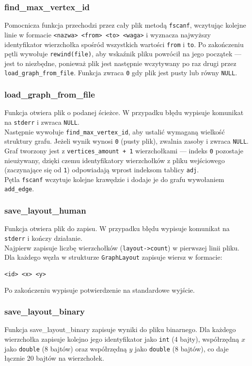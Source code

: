 \documentclass[12pt]{article}
\begin{document}
\subsubsection{find\_max\_vertex\_id}
Pomocnicza funkcja przechodzi przez cały plik metodą \texttt{fscanf}, wczytując kolejne
linie w formacie \texttt{<nazwa> <from> <to> <waga>} i wyznacza najwyższy identyfikator
wierzchołka spośród wszystkich wartości \texttt{from} i \texttt{to}.
Po zakończeniu pętli wywołuje \texttt{rewind(file)}, aby wskaźnik pliku powrócił na
jego początek --- jest to niezbędne, ponieważ plik jest następnie wczytywany po raz
drugi przez \texttt{load\_graph\_from\_file}. Funkcja zwraca \texttt{0} gdy plik jest
pusty lub równy \texttt{NULL}.

\subsubsection{load\_graph\_from\_file}
Funkcja otwiera plik o podanej ścieżce. W przypadku błędu wypisuje komunikat na
\texttt{stderr} i zwraca \texttt{NULL}.\\
Następnie wywołuje \texttt{find\_max\_vertex\_id}, aby ustalić wymaganą wielkość
struktury grafu. Jeżeli wynik wynosi \texttt{0} (pusty plik), zwalnia zasoby i zwraca
\texttt{NULL}.\\
Graf tworzony jest z \texttt{vertices\_amount + 1} wierzchołkami --- indeks \texttt{0}
pozostaje nieużywany, dzięki czemu identyfikatory wierzchołków z pliku wejściowego
(zaczynające się od \texttt{1}) odpowiadają wprost indeksom tablicy \texttt{adj}.\\
Pętla \texttt{fscanf} wczytuje kolejne krawędzie i dodaje je do grafu wywołaniem
\texttt{add\_edge}.

\subsubsection{save\_layout\_human}
Funkcja otwiera plik do zapisu. W przypadku błędu wypisuje komunikat na \texttt{stderr}
i kończy działanie.\\
Najpierw zapisuje liczbę wierzchołków (\texttt{layout->count}) w pierwszej linii pliku.\\
Dla każdego węzła w strukturze \texttt{GraphLayout} zapisuje wiersz w formacie:
\begin{center}
	\texttt{<id> <x> <y>}
\end{center}
Po zakończeniu wypisuje potwierdzenie na standardowe wyjście.

\subsubsection{save\_layout\_binary}
Funkcja save\_layout\_binary zapisuje wyniki do pliku binarnego. Dla każdego wierzchołka
zapisuje kolejno jego identyfikator jako \texttt{int} (4 bajty), współrzędną
$x$ jako \texttt{double} (8 bajtów) oraz współrzędną $y$ jako \texttt{double}
(8 bajtów), co daje łącznie 20 bajtów na wierzchołek.
\end{document}
